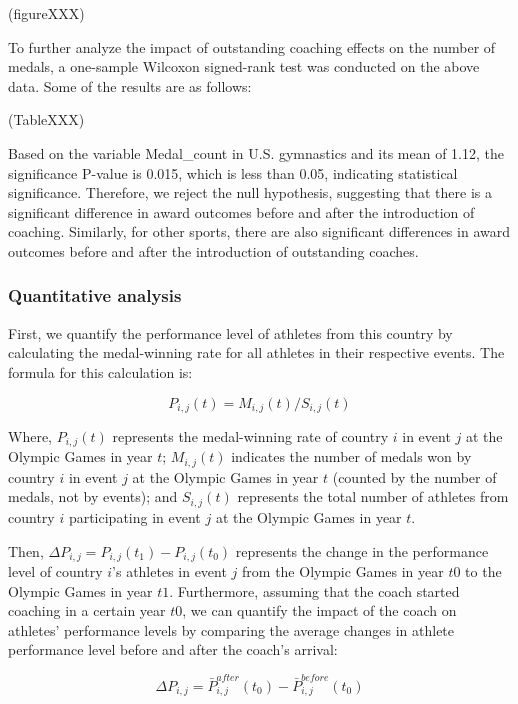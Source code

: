 \documentclass{mcmthesis}
\begin{document}
(figureXXX)

To further analyze the impact of outstanding coaching effects on the number of medals, a one-sample Wilcoxon signed-rank test was conducted on the above data. Some of the results are as follows:

(TableXXX)

Based on the variable Medal_count in U.S. gymnastics and its mean of 1.12, the significance P-value is 0.015, which is less than 0.05, indicating statistical significance. Therefore, we reject the null hypothesis, suggesting that there is a significant difference in award outcomes before and after the introduction of coaching. Similarly, for other sports, there are also significant differences in award outcomes before and after the introduction of outstanding coaches.

\subsubsection{Quantitative analysis}
First, we quantify the performance level of athletes from this country by calculating the medal-winning rate for all athletes in their respective events. The formula for this calculation is:

\begin{equation}
P_{i, j}(t) = M_{i, j}(t) / S_{i, j}(t)
\end{equation}

Where, $P_{i, j}(t)$ represents the medal-winning rate of country $i$ in event $j$ at the Olympic Games in year $t$; $M_{i, j}(t)$ indicates the number of medals won by country $i$ in event $j$ at the Olympic Games in year $t$ (counted by the number of medals, not by events); and $S_{i, j}(t)$ represents the total number of athletes from country $i$ participating in event $j$ at the Olympic Games in year $t$.

Then, $\Delta P_{i, j} = P_{i, j}(t_{1}) - P_{i, j}(t_{0})$ represents the change in the performance level of country $i$'s athletes in event $j$ from the Olympic Games in year $t0$ to the Olympic Games in year $t1$. Furthermore, assuming that the coach started coaching in a certain year $t0$, we can quantify the impact of the coach on athletes' performance levels by comparing the average changes in athlete performance level before and after the coach's arrival:

\begin{equation}
\Delta P_{i, j} = \bar{P}_{i, j}^{after}(t_{0}) - \bar{P}_{i, j}^{before}(t_{0})
\end{equation}
\end{document}
